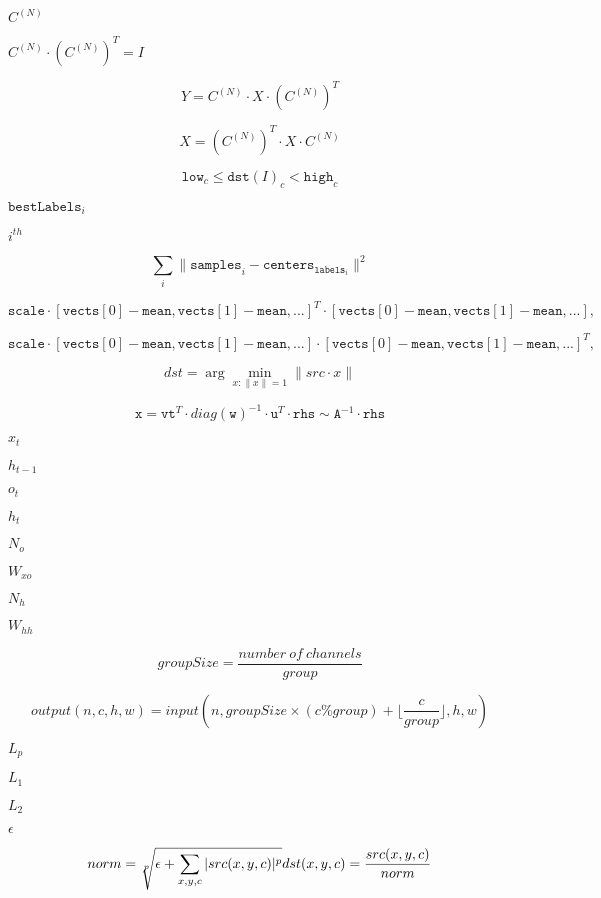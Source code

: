 \documentclass{article}
\begin{document}
$C^{(N)}$
\pagebreak

$C^{(N)} \cdot \left(C^{(N)}\right)^T = I$
\pagebreak

\[Y = C^{(N)} \cdot X \cdot \left (C^{(N)} \right )^T\]
\pagebreak

\[X = \left (C^{(N)} \right )^T \cdot X \cdot C^{(N)}\]
\pagebreak

\[\texttt{low} _c \leq \texttt{dst} (I)_c < \texttt{high} _c\]
\pagebreak

$\texttt{bestLabels}_i$
\pagebreak

$i^{th}$
\pagebreak

\[\sum _i \| \texttt{samples} _i - \texttt{centers} _{ \texttt{labels} _i} \| ^2\]
\pagebreak

\[\texttt{scale} \cdot [ \texttt{vects} [0]- \texttt{mean} , \texttt{vects} [1]- \texttt{mean} ,...]^T \cdot [ \texttt{vects} [0]- \texttt{mean} , \texttt{vects} [1]- \texttt{mean} ,...],\]
\pagebreak

\[\texttt{scale} \cdot [ \texttt{vects} [0]- \texttt{mean} , \texttt{vects} [1]- \texttt{mean} ,...] \cdot [ \texttt{vects} [0]- \texttt{mean} , \texttt{vects} [1]- \texttt{mean} ,...]^T,\]
\pagebreak

\[dst = \arg \min _{x: \| x \| =1} \| src \cdot x \|\]
\pagebreak

\[\texttt{x} = \texttt{vt} ^T \cdot diag( \texttt{w} )^{-1} \cdot \texttt{u} ^T \cdot \texttt{rhs} \sim \texttt{A} ^{-1} \cdot \texttt{rhs}\]
\pagebreak

$x_t$
\pagebreak

$h_{t-1}$
\pagebreak

$o_t$
\pagebreak

$h_t$
\pagebreak

$N_o$
\pagebreak

$ W_{xo} $
\pagebreak

$N_h$
\pagebreak

$ W_{hh} $
\pagebreak

\[ groupSize = \frac{number\ of\ channels}{group} \]
\pagebreak

\[ output(n, c, h, w) = input(n, groupSize \times (c \% group) + \lfloor \frac{c}{group} \rfloor, h, w) \]
\pagebreak

$ L_p $
\pagebreak

$ L_1 $
\pagebreak

$ L_2 $
\pagebreak

$ \epsilon $
\pagebreak

\[ norm = \sqrt[p]{\epsilon + \sum_{x, y, c} |src(x, y, c)|^p } \\ dst(x, y, c) = \frac{ src(x, y, c) }{norm} \]
\pagebreak
\end{document}
